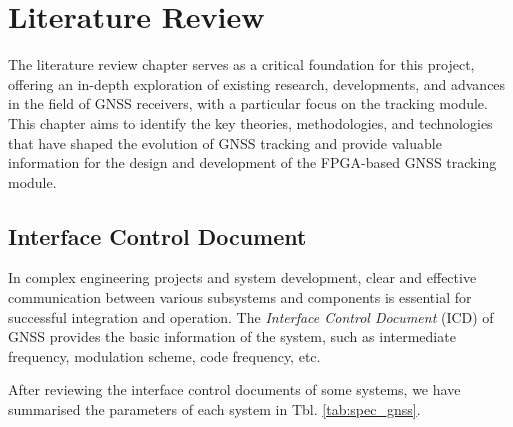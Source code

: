\chapter{Literature Review}

The literature review chapter serves as a critical foundation for this project, offering an in-depth exploration of existing research, developments, and advances in the field of GNSS receivers, with a particular focus on the tracking module. This chapter aims to identify the key theories, methodologies, and technologies that have shaped the evolution of GNSS tracking and provide valuable information for the design and development of the FPGA-based GNSS tracking module.

\section{Interface Control Document\texorpdfstring{\cite{RN170, RN171, RN172, RN174, RN173, RN175}}{}}
In complex engineering projects and system development, clear and effective communication between various subsystems and components is essential for successful integration and operation. The \textit{Interface Control Document} (ICD) of GNSS provides the basic information of the system, such as intermediate frequency, modulation scheme, code frequency, etc. 

After reviewing the interface control documents of some systems, we have summarised the parameters of each system in Tbl. \ref{tab:spec_gnss}. 

